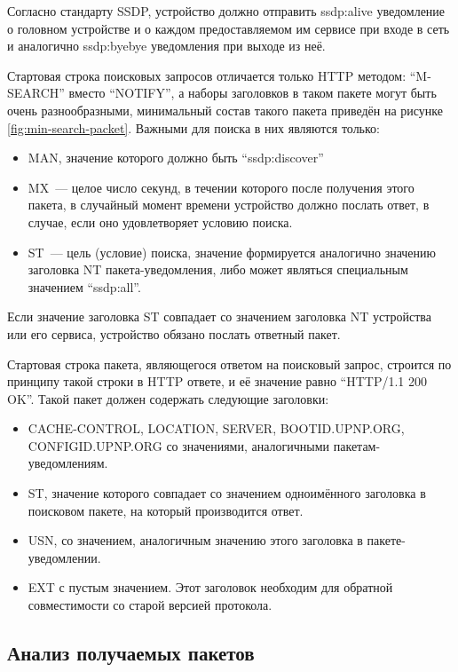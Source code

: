 Согласно стандарту SSDP, устройство должно отправить ssdp:alive уведомление о головном устройстве и о каждом предоставляемом им сервисе при входе в сеть и аналогично ssdp:byebye уведомления при выходе из неё.

Стартовая строка поисковых запросов отличается только HTTP методом: "`M-SEARCH"' вместо "`NOTIFY"', а наборы заголовков в таком пакете могут быть очень разнообразными, минимальный состав такого пакета приведён на рисунке \ref{fig:min-search-packet}.
Важными для поиска в них являются только:

\begin{itemize}
	\item MAN, значение которого должно быть "`ssdp:discover"'
	\item MX~--- целое число секунд, в течении которого после получения этого пакета, в случайный момент времени устройство должно послать ответ, в случае, если оно удовлетворяет условию поиска.
	\item ST~--- цель (условие) поиска, значение формируется аналогично значению заголовка NT пакета-уведомления, либо может являться специальным значением "`ssdp:all"'.
\end{itemize}

Если значение заголовка ST совпадает со значением заголовка NT устройства или его сервиса, устройство обязано послать ответный пакет.


Стартовая строка пакета, являющегося ответом на поисковый запрос, строится по принципу такой строки в HTTP ответе, и её значение равно "`HTTP/1.1 200 OK"'.
Такой пакет должен содержать следующие заголовки:
\begin{itemize}
	\item CACHE-CONTROL, LOCATION, SERVER, BOOTID.UPNP.ORG, CONFIGID.UPNP.ORG со значениями, аналогичными пакетам-уведомлениям.
	\item ST, значение которого совпадает со значением одноимённого заголовка в поисковом пакете, на который производится ответ.
	\item USN, со значением, аналогичным значению этого заголовка в пакете-уведомлении.
	\item EXT с пустым значением.
Этот заголовок необходим для обратной совместимости со старой версией протокола.
\end{itemize}

\subsection{Анализ получаемых пакетов}

